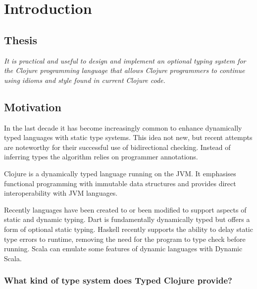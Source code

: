 
\chapter{Introduction}

\section{Thesis}

\emph{It is practical and useful to design and implement an optional typing system 
for the Clojure programming language that allows Clojure programmers to continue 
using idioms and style found in current Clojure code.}

\section{Motivation}


In the last decade it has become increasingly common to enhance
dynamically typed languages with static type systems. This idea not new,
but recent attempts are noteworthy for their successful use of bidirectional checking.
Instead of inferring types the algorithm relies on programmer annotations.

Clojure is a dynamically typed language running on the JVM. It emphasises
functional programming with immutable data structures
and provides direct interoperability with JVM languages.

Recently languages have been created to or been modified to support aspects
of static and dynamic typing.
Dart is fundamentally dynamically typed but offers a form of optional
static typing. Haskell recently supports the ability to delay static type errors 
to runtime, removing the need for the program to type check before running.
Scala can emulate some features of dynamic languages with Dynamic Scala.

\subsection{What kind of type system does Typed Clojure provide?}



